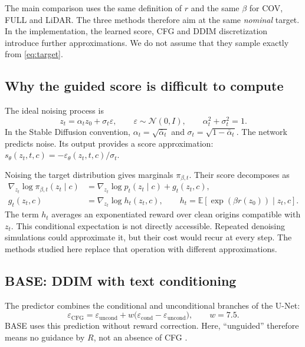\documentclass[11pt,a4paper]{article}
\newcommand{\E}{\mathbb{E}}
\begin{document}
The main comparison uses the same definition of $r$ and the same $\beta$ for COV, FULL and LiDAR. The three methods therefore aim at the same \emph{nominal} target. In the implementation, the learned score, CFG and DDIM discretization introduce further approximations. We do not assume that they sample exactly from \eqref{eq:target}.

\subsection{Why the guided score is difficult to compute}
The ideal noising process is
\begin{equation}
z_t=\alpha_tz_0+\sigma_t\varepsilon,\qquad
\varepsilon\sim\mathcal N(0,I),\qquad \alpha_t^2+\sigma_t^2=1.
\end{equation}
In the Stable Diffusion convention, $\alpha_t=\sqrt{\bar\alpha_t}$ and $\sigma_t=\sqrt{1-\bar\alpha_t}$. The network predicts noise. Its output provides a score approximation: $s_\theta(z_t,t,c)=-\varepsilon_\theta(z_t,t,c)/\sigma_t$.

Noising the target distribution gives marginals $\pi_{\beta,t}$. Their score decomposes as
\begin{align}
\nabla_{z_t}\log\pi_{\beta,t}(z_t\mid c)
&=\nabla_{z_t}\log p_t(z_t\mid c)+g_t(z_t,c),\label{eq:score}\\
g_t(z_t,c)&=\nabla_{z_t}\log h_t(z_t,c),\qquad
h_t=\E\!\left[\exp(\beta r(z_0))\mid z_t,c\right].\label{eq:tilt}
\end{align}
The term $h_t$ averages an exponentiated reward over clean origins compatible with $z_t$. This conditional expectation is not directly accessible. Repeated denoising simulations could approximate it, but their cost would recur at every step. The methods studied here replace that operation with different approximations.

\subsection{BASE: DDIM with text conditioning}
The predictor combines the conditional and unconditional branches of the U-Net:
\begin{equation}\label{eq:cfg}
\varepsilon_{\mathrm{CFG}}
=\varepsilon_{\mathrm{uncond}}
+w\bigl(\varepsilon_{\mathrm{cond}}-\varepsilon_{\mathrm{uncond}}\bigr),
\qquad w=7.5.
\end{equation}
BASE uses this prediction without reward correction. Here, ``unguided'' therefore means no guidance by $R$, not an absence of CFG \cite{cfg}.
\end{document}
